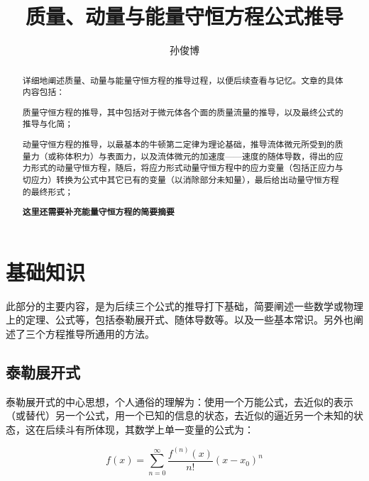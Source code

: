 \documentclass[a4paper,12pt]{article}
\title{质量、动量与能量守恒方程公式推导}
\author{孙俊博}
\begin{document}
\maketitle{}

\begin{abstract}
详细地阐述质量、动量与能量守恒方程的推导过程，以便后续查看与记忆。文章的具体内容包括：\par
质量守恒方程的推导，其中包括对于微元体各个面的质量流量的推导，以及最终公式的推导与化简；\par
动量守恒方程的推导，以最基本的牛顿第二定律为理论基础，推导流体微元所受到的质量力（或称体积力）与表面力，以及流体微元的加速度——速度的随体导数，得出的应力形式的动量守恒方程，随后，将应力形式动量守恒方程中的应力变量（包括正应力与切应力）转换为公式中其它已有的变量（以消除部分未知量），最后给出动量守恒方程的最终形式；\par
\textbf{这里还需要补充能量守恒方程的简要摘要}
\end{abstract}

\section{基础知识}
	此部分的主要内容，是为后续三个公式的推导打下基础，简要阐述一些数学或物理上的定理、公式等，包括泰勒展开式、随体导数等。以及一些基本常识。另外也阐述了三个方程推导所通用的方法。\par

	\subsection{泰勒展开式}
		泰勒展开式的中心思想，个人通俗的理解为：使用一个万能公式，去近似的表示（或替代）另一个公式，用一个已知的信息的状态，去近似的逼近另一个未知的状态，这在后续斗有所体现，其数学上单一变量的公式为：\par
		\begin{equation}
			f(x)=\sum_{n=0}^{\infty} \frac{f^{(n)}(x)}{n!} {(x-x_{0})}^{n}
		\end{equation}
\end{document}
